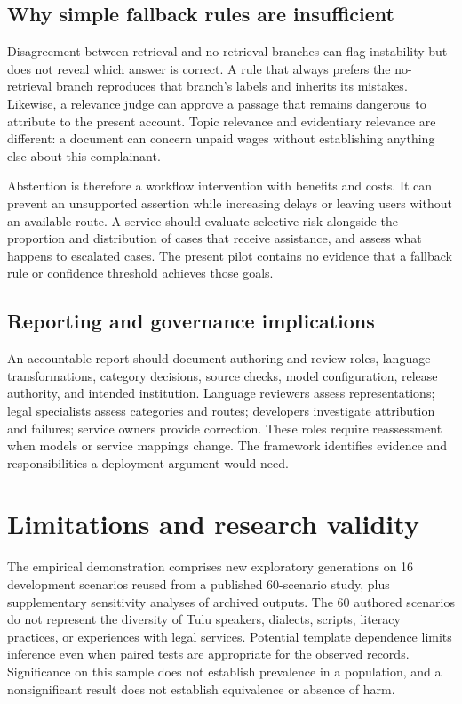 \documentclass[manuscript,screen,review,anonymous]{acmart}
\begin{document}
\subsection{Why simple fallback rules are insufficient}

Disagreement between retrieval and no-retrieval branches can flag instability but does not reveal which answer is correct. A rule that always prefers the no-retrieval branch reproduces that branch's labels and inherits its mistakes. Likewise, a relevance judge can approve a passage that remains dangerous to attribute to the present account. Topic relevance and evidentiary relevance are different: a document can concern unpaid wages without establishing anything else about this complainant.

Abstention is therefore a workflow intervention with benefits and costs. It can prevent an unsupported assertion while increasing delays or leaving users without an available route. A service should evaluate selective risk alongside the proportion and distribution of cases that receive assistance, and assess what happens to escalated cases. The present pilot contains no evidence that a fallback rule or confidence threshold achieves those goals.

\subsection{Reporting and governance implications}

An accountable report should document authoring and review roles, language transformations, category decisions, source checks, model configuration, release authority, and intended institution. Language reviewers assess representations; legal specialists assess categories and routes; developers investigate attribution and failures; service owners provide correction. These roles require reassessment when models or service mappings change. The framework identifies evidence and responsibilities a deployment argument would need.

\section{Limitations and research validity}

The empirical demonstration comprises new exploratory generations on 16 development scenarios reused from a published 60-scenario study, plus supplementary sensitivity analyses of archived outputs. The 60 authored scenarios do not represent the diversity of Tulu speakers, dialects, scripts, literacy practices, or experiences with legal services. Potential template dependence limits inference even when paired tests are appropriate for the observed records. Significance on this sample does not establish prevalence in a population, and a nonsignificant result does not establish equivalence or absence of harm.
\end{document}
